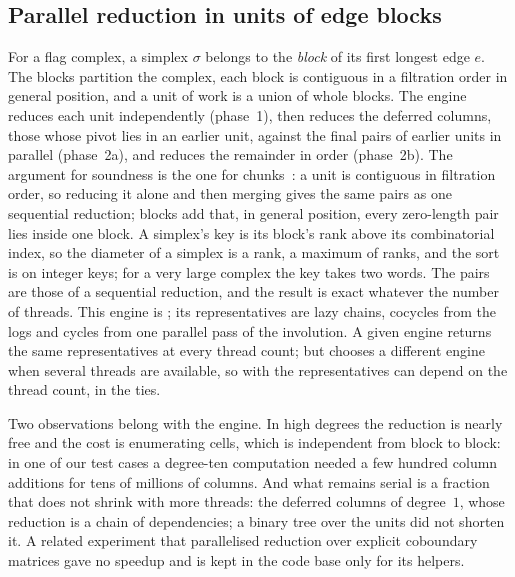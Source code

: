 \subsection{Parallel reduction in units of edge blocks}\label{sec:parallel}

For a flag complex, a simplex $\sigma$ belongs to the \emph{block} of its first longest edge $e$. The blocks partition
the complex, each block is contiguous in a filtration order in general position, and a unit of work is a union of whole blocks.
The engine reduces each unit independently (phase~1), then reduces the deferred columns, those whose pivot lies in an earlier
unit, against the final pairs of earlier units in parallel (phase~2a), and reduces the remainder in order (phase~2b). The
argument for soundness is the one for chunks~\cite{bkr2014chunks}: a unit is contiguous in filtration order, so reducing it alone
and then merging gives the same pairs as one sequential reduction; blocks add that, in general position, every zero-length
pair lies inside one block. A simplex's key is its block's rank above its combinatorial index, so the diameter of a simplex is
a rank, a maximum of ranks, and the sort is on integer keys; for a very large complex the key takes two words. The pairs are
those of a sequential reduction, and the result is exact whatever the number of threads. This engine is ; its
representatives are lazy chains, cocycles from the logs and cycles from one parallel pass of the involution.
A given engine returns the same representatives at every thread count; but  chooses a different engine when
several threads are available, so with  the representatives can depend on the thread count, in the ties.

Two observations belong with the engine. In high degrees the reduction is nearly free and the cost is enumerating cells,
which is independent from block to block: in one of our test cases a degree-ten computation needed a few hundred column
additions for tens of millions of columns. And what remains serial is a fraction that does not shrink with more threads: the
deferred columns of degree~$1$, whose reduction is a chain of dependencies; a binary tree over the units did not
shorten it. A related experiment that parallelised reduction over explicit coboundary matrices gave no speedup and is kept in
the code base only for its helpers.

